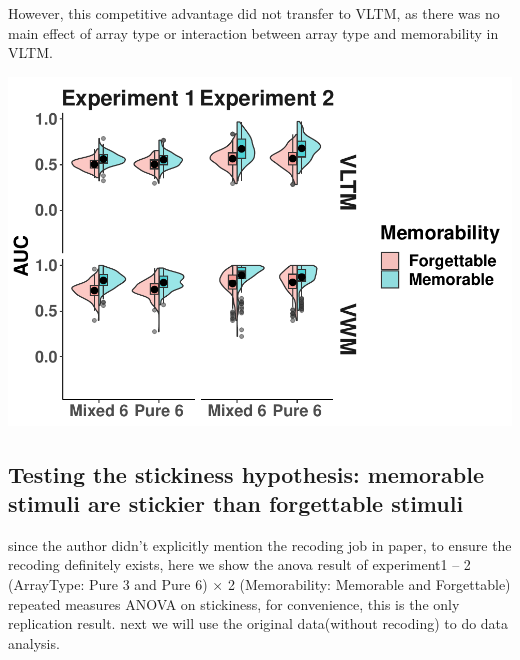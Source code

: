 \documentclass[
  man]{apa6}
\begin{document}
However, this competitive advantage did not transfer to VLTM, as there was no main effect of array type or interaction between array type and memorability in VLTM.

\includegraphics{Script_Re_Greer_2023_group1Rock_2023_files/figure-latex/Split violin plots for competitive hypo-1.pdf}

\hypertarget{testing-the-stickiness-hypothesis-memorable-stimuli-are-stickier-than-forgettable-stimuli}{%
\subsection{Testing the stickiness hypothesis: memorable stimuli are stickier than forgettable stimuli}\label{testing-the-stickiness-hypothesis-memorable-stimuli-are-stickier-than-forgettable-stimuli}}

since the author didn't explicitly mention the recoding job in paper, to ensure the recoding definitely exists, here we show the anova result of experiment1 -- 2 (ArrayType: Pure 3 and Pure 6) × 2 (Memorability: Memorable and Forgettable) repeated measures ANOVA on stickiness, for convenience, this is the only replication result. next we will use the original data(without recoding) to do data analysis.
\end{document}
